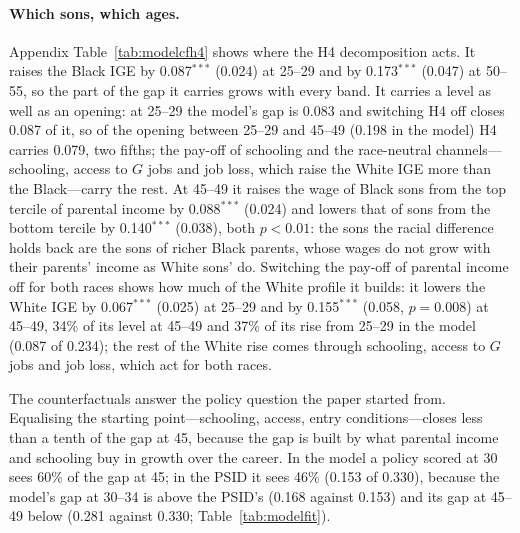 \paragraph{Which sons, which ages.} Appendix Table~\ref{tab:modelcfh4} shows where the H4 decomposition acts. It raises the Black
IGE by 0.087$^{***}$ (0.024) at 25--29 and by 0.173$^{***}$ (0.047) at 50--55, so the part of the gap it carries grows
with every band. It carries a level as well as an opening: at 25--29 the model's gap is 0.083 and switching H4 off closes
0.087 of it, so of the opening between 25--29 and 45--49 (0.198 in the model) H4 carries 0.079, two fifths; the pay-off
of schooling and the race-neutral channels---schooling, access to $G$ jobs and job loss, which raise the White IGE more
than the Black---carry the rest. At 45--49 it raises the wage of Black sons from the top tercile of parental income by 0.088$^{***}$
(0.024) and lowers that of sons from the bottom tercile by 0.140$^{***}$ (0.038), both $p < 0.01$: the sons the racial
difference holds back are the sons of richer Black parents, whose wages do not grow with their parents' income as White
sons' do. Switching the pay-off of parental income off for both races shows how much of the White profile it builds: it
lowers the White IGE by 0.067$^{***}$ (0.025) at 25--29 and by 0.155$^{***}$ (0.058, $p = 0.008$) at 45--49, 34\% of its
level at 45--49 and 37\% of its rise from 25--29 in the model (0.087 of 0.234); the rest of the White rise comes through
schooling, access to $G$ jobs and job loss, which act for both races.

The counterfactuals answer the policy question the paper started from. Equalising the starting point---schooling,
access, entry conditions---closes less than a tenth of the gap at 45, because the gap is built by what parental income
and schooling buy in growth over the career. In the model a policy scored at 30 sees 60\% of the gap at 45; in the PSID it sees 46\% (0.153 of 0.330),
because the model's gap at 30--34 is above the PSID's (0.168 against 0.153) and its gap at 45--49 below (0.281
against 0.330; Table~\ref{tab:modelfit}).

